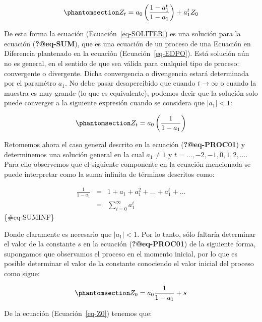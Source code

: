 \documentclass[
  a4paper,
]{article}
\begin{document}
\begin{equation}\phantomsection\label{eq-SOLITER}{
    Z_t = a_0 \left( \frac{1 - a^{t}_1}{1 - a_1} \right) + a^t_1 Z_0
}\end{equation}

De esta forma la ecuación (Ecuación~\ref{eq-SOLITER}) es una solución
para la ecuación (\textbf{?@eq-SUM}), que es una ecuación de un proceso
de una Ecuación en Diferencia plantenado en la ecuación
(Ecuación~\ref{eq-EDPO}). Está solución aún no es general, en el sentido
de que sea válida para cualquiel tipo de proceso: convergente o
divergente. Dicha convergencia o divengencia estará determinada por el
paramétro \(a_1\). No debe pasar desapercibido que cuando
\(t \rightarrow \infty\) o cuando la muestra es muy grande (lo que es
equivalente), podemos decir que la solución solo puede converger a la
siguiente expresión cuando se considera que \(|a_1| < 1\):

\begin{equation}\phantomsection\label{eq-trayec}{
    Z_t = a_0 \left( \frac{1}{1 - a_1} \right)
}\end{equation}

Retomemos ahora el caso general descrito en la ecuación
(\textbf{?@eq-PROC01}) y determinemos una solución general en la cual
\(a_1 \neq 1\) y \(t = \ldots, -2, -1, 0, 1, 2, \ldots\). Para ello
observemos que el siguiente componente en la ecuación mencionada se
puede interpretar como la suma infinita de términos descritos como:

\begin{eqnarray}
    \frac{1}{1 - a_1} & = & 1 + a_1 + a_1^2 + \ldots + a_1^t + \ldots \nonumber \\
    & = & \sum_{i = 0}^{\infty} a_1^{i}
\end{eqnarray} \{\#eq-SUMINF\}

Donde claramente es necesario que \(|a_1| < 1\). Por lo tanto, sólo
faltaría determinar el valor de la constante \(s\) en la ecuación
(\textbf{?@eq-PROC01}) de la siguiente forma, supongamos que observamos
el proceso en el momento inicial, por lo que es posible determinar el
valor de la constante conociendo el valor inicial del proceso como
sigue:

\begin{equation}\phantomsection\label{eq-Z0}{
    Z_0 = a_0 \frac{1}{1 - a_1} + s
}\end{equation}

De la ecuación (Ecuación~\ref{eq-Z0}) tenemos que:
\end{document}
